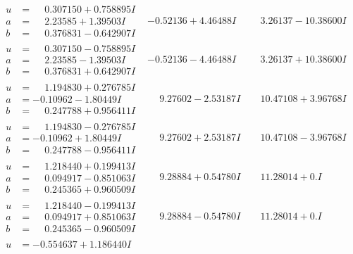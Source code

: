 \documentclass[1p]{elsarticle_modified}
\theoremstyle{definition}
\begin{document}
$$\begin{array}{c|c|c}
\begin{aligned}
u &= \phantom{-}0.307150 + 0.758895 I \\
a &= \phantom{-}2.23585 + 1.39503 I \\
b &= \phantom{-}0.376831 - 0.642907 I\end{aligned}
 & -0.52136 + 4.46488 I & \phantom{-}3.26137 - 10.38600 I \\ \hline\begin{aligned}
u &= \phantom{-}0.307150 - 0.758895 I \\
a &= \phantom{-}2.23585 - 1.39503 I \\
b &= \phantom{-}0.376831 + 0.642907 I\end{aligned}
 & -0.52136 - 4.46488 I & \phantom{-}3.26137 + 10.38600 I \\ \hline\begin{aligned}
u &= \phantom{-}1.194830 + 0.276785 I \\
a &= -0.10962 - 1.80449 I \\
b &= \phantom{-}0.247788 + 0.956411 I\end{aligned}
 & \phantom{-}9.27602 - 2.53187 I & \phantom{-}10.47108 + 3.96768 I \\ \hline\begin{aligned}
u &= \phantom{-}1.194830 - 0.276785 I \\
a &= -0.10962 + 1.80449 I \\
b &= \phantom{-}0.247788 - 0.956411 I\end{aligned}
 & \phantom{-}9.27602 + 2.53187 I & \phantom{-}10.47108 - 3.96768 I \\ \hline\begin{aligned}
u &= \phantom{-}1.218440 + 0.199413 I \\
a &= \phantom{-}0.094917 - 0.851063 I \\
b &= \phantom{-}0.245365 + 0.960509 I\end{aligned}
 & \phantom{-}9.28884 + 0.54780 I & \phantom{-}11.28014 + 0. I\phantom{ +0.000000I} \\ \hline\begin{aligned}
u &= \phantom{-}1.218440 - 0.199413 I \\
a &= \phantom{-}0.094917 + 0.851063 I \\
b &= \phantom{-}0.245365 - 0.960509 I\end{aligned}
 & \phantom{-}9.28884 - 0.54780 I & \phantom{-}11.28014 + 0. I\phantom{ +0.000000I} \\ \hline\begin{aligned}
u &= -0.554637 + 1.186440 I \\

\end{aligned}
\end{array}$$
\end{document}
